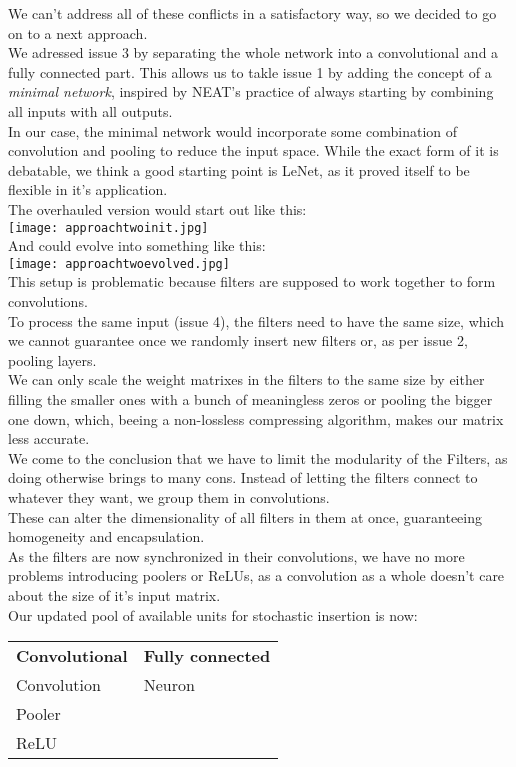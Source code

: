 We can't address all of these conflicts in a satisfactory way, so we decided to go on to a next approach.\\
We adressed issue 3 by separating the whole network into a convolutional and a fully connected part. This allows us to takle issue 1 by adding the concept of a \emph{minimal network}, inspired by NEAT's practice of always starting by combining all inputs with all outputs.\\
In our case, the minimal network would incorporate some combination of convolution and pooling to reduce the input space. While the exact form of it is debatable, we think a good starting point is LeNet, as it proved itself to be flexible in it's application. \cite{YannLeCun1998}\\
The overhauled version would start out like this:\\
\texttt{[image: approachtwoinit.jpg]}\\
And could evolve into something like this:\\
\texttt{[image: approachtwoevolved.jpg]}\\
This setup is problematic because filters are supposed to work together to form convolutions.\\
To process the same input (issue 4), the filters need to have the same size, which we cannot guarantee once we randomly insert new filters or, as per issue 2, pooling layers.\\
We can only scale the weight matrixes in the filters to the same size by either filling the smaller ones with a bunch of meaningless zeros or pooling the bigger one down, which, beeing a non-lossless compressing algorithm, makes our matrix less accurate.\\
We come to the conclusion that we have to limit the modularity of the Filters, as doing otherwise brings to many cons.  
Instead of letting the filters connect to whatever they want, we group them in convolutions.\\
These can alter the dimensionality of all filters in them at once, guaranteeing homogeneity and encapsulation.\\
As the filters are now synchronized in their convolutions, we have no more problems introducing poolers or ReLUs, as a convolution as a whole doesn't care about the size of it's input matrix.\\
Our updated pool of available units for stochastic insertion is now:  

\begin{table}[h]
	\begin{tabular}{ll}
		\textbf{Convolutional} & \textbf{Fully connected} \\
		Convolution            & Neuron                   \\
		Pooler                 &                          \\
		ReLU                   &                         
	\end{tabular}
\end{table}


